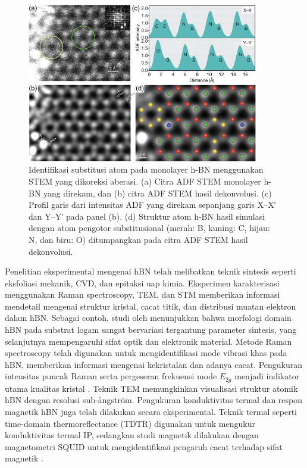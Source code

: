 \begin{figure}[htbp]
  \centering
  \includegraphics[width=0.9\textwidth]{gambar/hBN_stem.jpeg}
  \caption{Identifikasi substitusi atom pada monolayer h-BN menggunakan STEM yang dikoreksi aberasi. 
  (a) Citra ADF STEM monolayer h-BN yang direkam, dan 
  (b) citra ADF STEM hasil dekonvolusi. 
  (c) Profil garis dari intensitas ADF yang direkam sepanjang garis X--X′ dan Y--Y′ pada panel (b). 
  (d) Struktur atom h-BN hasil simulasi dengan atom pengotor substitusional (merah: B, kuning: C, hijau: N, dan biru: O) ditumpangkan pada citra ADF STEM hasil dekonvolusi. \citep{Zhang2020}}
  \label{fig:ADF_hBN_substitusi}
\end{figure}

Penelitian eksperimental mengenai hBN telah melibatkan teknik sintesis seperti eksfoliasi mekanik, CVD, dan epitaksi uap kimia.
Eksperimen karakterisasi menggunakan Raman spectroscopy, TEM, dan STM memberikan informasi mendetail mengenai struktur kristal, cacat titik, dan distribusi muatan elektron dalam hBN.
Sebagai contoh, studi oleh \citep{Bhimanapati2016} menunjukkan bahwa morfologi domain hBN pada substrat logam sangat bervariasi tergantung parameter sintesis, yang selanjutnya mempengaruhi sifat optik dan elektronik material.
Metode Raman spectroscopy telah digunakan untuk mengidentifikasi mode vibrasi khas pada hBN, memberikan informasi mengenai kekristalan dan adanya cacat.
Pengukuran intensitas puncak Raman serta pergeseran frekuensi mode \(E_{2g}\) menjadi indikator utama kualitas kristal \citep{Wang2017}.
Teknik TEM memungkinkan visualisasi struktur atomik hBN dengan resolusi sub-ångström.
Pengukuran konduktivitas termal dan respon magnetik hBN juga telah dilakukan secara eksperimental.
Teknik termal seperti time-domain thermoreflectance (TDTR) digunakan untuk mengukur konduktivitas termal IP, sedangkan studi magnetik dilakukan dengan magnetometri SQUID untuk mengidentifikasi pengaruh cacat terhadap sifat magnetik \citep{Zhang2020}.

